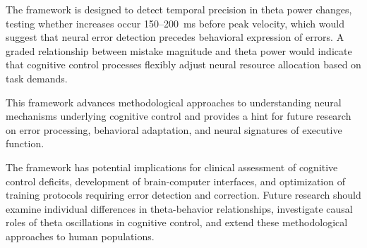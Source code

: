 \documentclass[11pt]{article}
\begin{document}
The framework is designed to detect temporal precision in theta power changes, testing whether increases occur 150--200~ms before peak velocity, which would suggest that neural error detection precedes behavioral expression of errors. A graded relationship between mistake magnitude and theta power would indicate that cognitive control processes flexibly adjust neural resource allocation based on task demands.

This framework advances methodological approaches to understanding neural mechanisms underlying cognitive control and provides a hint for future research on error processing, behavioral adaptation, and neural signatures of executive function. 

The framework has potential implications for clinical assessment of cognitive control deficits, development of brain-computer interfaces, and optimization of training protocols requiring error detection and correction. Future research should examine individual differences in theta-behavior relationships, investigate causal roles of theta oscillations in cognitive control, and extend these methodological approaches to human populations.
\end{document}
